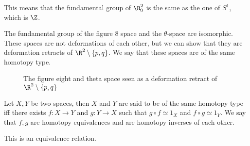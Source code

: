 \begin{remark}
    This means that the fundamental group of $\R^2_0$ is the same as the one of $S^1$, which is $\Z$.
\end{remark}
\begin{eg}
    The fundamental group of the figure $8$ space and the $\theta$-space are isomorphic.
    These spaces are not deformations of each other, but we can show that they are deformation retracts of $\R^2 \setminus \{p, q\}$.
    We say that these spaces are of the same homotopy type.
\begin{figure}[H]
    \centering
    \caption{The figure eight and theta space seen as a deformation retract of $\R^2 \setminus \{ p, q\} $}
    \label{fig:figure-eight-theta-space}
\end{figure}
\end{eg}
\begin{definition}
    Let $X, Y$ be two spaces, then $X$ and $Y$ are said to be of the same homotopy type iff there exists $f: X \to Y$ and $g: Y \to X$ such that $g  \circ f \simeq 1_X $ and $f  \circ  g \simeq 1_Y$.
    We say that $f, g$ are homotopy equivalences and are homotopy inverses of each other.
\end{definition}
\begin{remark}
    This is an equivalence relation.
\end{remark}

